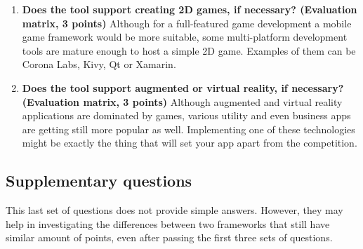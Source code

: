 \documentclass[english,master,public,dept460,male,cpdeclaration,oneside]{diploma}
\begin{document}
\begin{enumerate}
	\item \textbf{Does the tool support creating 2D games, if necessary? (Evaluation matrix, 3 points) }
	Although for a full-featured game development a mobile game framework would be more suitable, some multi-platform development tools are mature enough to host a simple 2D game. Examples of them can be Corona Labs, Kivy, Qt or Xamarin.
	
	\item \textbf{Does the tool support augmented or virtual reality, if necessary? (Evaluation matrix, 3 points) }
	Although augmented and virtual reality applications are dominated by games, various utility and even business apps are getting still more popular as well. Implementing one of these technologies might be exactly the thing that will set your app apart from the competition.
\end{enumerate}

\subsection{Supplementary questions}

This last set of questions does not provide simple answers. However, they may help in investigating the differences between two frameworks that still have similar amount of points, even after passing the first three sets of questions.
\end{document}

